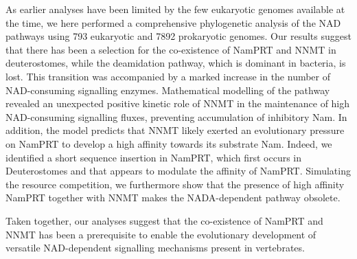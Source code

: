 As earlier analyses have been limited by the few eukaryotic genomes available at the time, we here performed a comprehensive phylogenetic analysis of the NAD pathways using 793 eukaryotic and 7892 prokaryotic genomes. Our results suggest that there has been a selection for the co-existence of NamPRT and NNMT in deuterostomes, while the deamidation pathway, which is dominant in bacteria, is lost. This transition was accompanied by a marked increase in the number of NAD-consuming signalling enzymes. Mathematical modelling of the pathway revealed an unexpected positive kinetic role of NNMT in the maintenance of high NAD-consuming signalling fluxes, preventing accumulation of inhibitory Nam. In addition, the model predicts that NNMT likely exerted an evolutionary pressure on NamPRT to develop a high affinity towards its substrate Nam. Indeed, we identified a short sequence insertion in NamPRT, which first occurs in Deuterostomes and that appears to modulate the affinity of NamPRT. Simulating the resource competition, we furthermore show that the presence of high affinity NamPRT together with NNMT makes the NADA-dependent pathway obsolete.

Taken together, our analyses suggest that the co-existence of NamPRT and NNMT has been a prerequisite to enable the evolutionary development of versatile NAD-dependent signalling mechanisms present in vertebrates.
